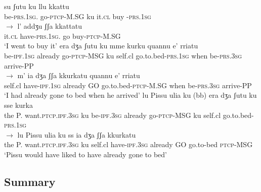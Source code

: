\documentclass[output=paper]{langscibook}
\begin{document}
\ea\label{ac47}
    \ea \label{ac47a}
        \ea \label{ac47ai}\gll su        ʃutu        ku  llu   kkattu\\
       be-\textsc{prs}.\textsc{1sg}.    go-\textsc{ptcp}-M.SG  ku   it.\textsc{cl} buy -\textsc{prs}.\textsc{1sg}\\
        \ex \label{ac47aii}$\rightarrow$ \gll l’   addʒu       ʃʃa   kkattatu\\
       it.\textsc{cl} have-\textsc{prs}.\textsc{1sg}.    go  buy-\textsc{ptcp}-M.SG\\
      \glt ‘I went to buy it’
        \z
    \ex\label{ac47b}
        \ea \label{ac47bi}\gll era      dʒa    ʃutu      ku mme   kurku     quannu  e’       rriatu \\
       be-\textsc{ipf}.\textsc{1sg} already go-\textsc{ptcp}-MSG ku self.cl go.to.bed-\textsc{prs}.\textsc{1sg}
       when    be-\textsc{prs}.\textsc{3sg}  arrive-PP\\
        \ex    \label{ac47bii}$\rightarrow$  \gll m’   ia        dʒa   ʃʃa  kkurkatu        quannu  e’        rriatu\\
       self.cl  have-\textsc{ipf}.\textsc{1sg} already GO  go.to.bed-\textsc{ptcp}-M.SG
       when    be-\textsc{prs}.\textsc{3sg}  arrive-PP\\
       \glt ‘I had already gone to bed when he arrived’
        \z
    \ex\label{ac47c}
        \ea \label{ac47ci}\gll lu Pissu ulia   ku    (bb) era    dʒa   ʃutu         ku sse    kurka\\
       the P.  want.\textsc{ptcp.ipf.3sg} ku be-\textsc{ipf}.\textsc{3sg} already go-\textsc{ptcp}-MSG    ku self.cl   go.to.bed-\textsc{prs}.\textsc{1sg}\\
        \ex  \label{ac47cii}  $\rightarrow$ \gll lu Pissu ulia   ku       ss   ia      dʒa         ʃʃa  kkurkatu\\
      the P.  want.\textsc{ptcp.ipf.3sg} ku self.cl  have-\textsc{ipf}.\textsc{3sg} already
       GO go.to-bed \textsc{ptcp}-MSG\\
      \glt ‘Pissu would have liked to have already gone to bed’
        \z
    \z
\z

\subsection{Summary}
\end{document}
